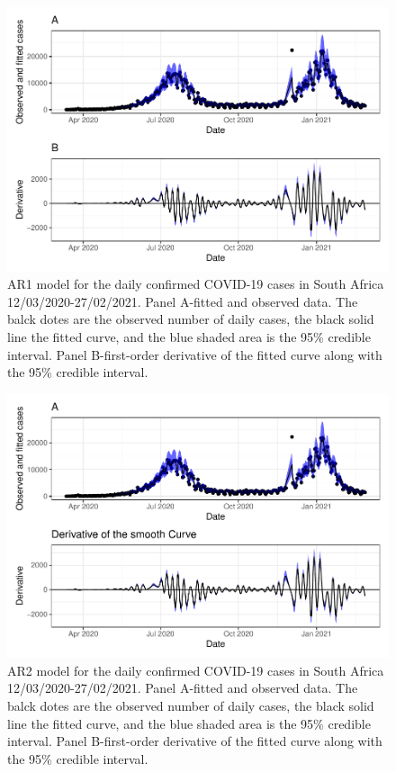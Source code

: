 \documentclass[10pt,letterpaper]{article}
\begin{document}
\setcounter{table}{0} \renewcommand{\thetable}{S\arabic{table}} \setcounter{figure}{0} \renewcommand{\thefigure}{S\arabic{figure}}

\begin{figure}[h]
	\includegraphics[width=0.99\linewidth]{COVIDincidenceSA_files/figure-latex/unnamed-chunk-6-1} \caption{AR1 model for the daily confirmed COVID-19 cases in South Africa 12/03/2020-27/02/2021.  Panel A-fitted and observed data. The balck dotes are the observed number of daily cases, the black solid line the fitted curve, and the blue shaded area is the 95\% credible interval. Panel B-first-order derivative of the fitted curve along with the 95\% credible interval.}\label{fig:ar1fitted}
\end{figure}

\begin{figure}[h]
\includegraphics[width=0.99\linewidth]{COVIDincidenceSA_files/figure-latex/unnamed-chunk-13-1} \caption{AR2 model for the daily confirmed COVID-19 cases in South Africa 12/03/2020-27/02/2021.  Panel A-fitted and observed data. The balck dotes are the observed number of daily cases, the black solid line the fitted curve, and the blue shaded area is the 95\% credible interval. Panel B-first-order derivative of the fitted curve along with the 95\% credible interval.}\label{fig:ar2fitted}
\end{figure}
\end{document}
